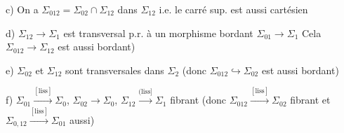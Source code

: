 c) 
On a $\Sigma_{012}=\Sigma_{02}\cap\Sigma_{12}$ dans $\Sigma_{12}$ i.e.
le carré sup. est aussi cartésien

d) $\Sigma_{12}\longrightarrow\Sigma_1$ est transversal p.r. à
un morphisme bordant $\Sigma_{01}\longrightarrow\Sigma_1$ Cela 
$\Sigma_{012}\longrightarrow\Sigma_{12}$ est aussi bordant)

e) $\Sigma_{02}$ et $\Sigma_{12}$ sont  transversales dans $\Sigma_2$
(donc $\Sigma_{012}\hookrightarrow\Sigma_{02}$ est aussi bordant)

f) $\Sigma_{01}\xrightarrow{[\mathrm{liss}]}\Sigma_0$, $\Sigma_{02}\longrightarrow\Sigma_0$, $\Sigma_{12}\xrightarrow{(\mathrm{liss}]}\Sigma_1$ fibrant
(donc $\Sigma_{012}\xrightarrow{[\mathrm{liss}]}\Sigma_{02}$ fibrant  et $\Sigma_{0,12}\xrightarrow{[\mathrm{liss}]}\Sigma_{01}$ aussi)

